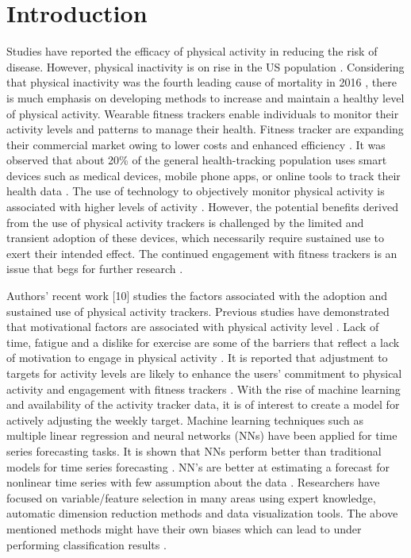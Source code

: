 \documentclass[preprint,12pt]{elsarticle}
\begin{document}
\section{Introduction}
Studies have reported the efficacy of physical activity in reducing the risk of disease. However, physical inactivity is on rise in the US population \cite{bassuk2005epidemiological}. Considering that physical inactivity was the fourth leading cause of mortality in 2016 \cite{mercer2016behavior}, there is much emphasis on developing methods to increase and maintain a healthy level of physical activity. Wearable fitness trackers enable individuals to monitor their activity levels and patterns to manage their health. Fitness tracker are expanding their commercial market owing to lower costs and enhanced efficiency \cite{eheman2012annual}. It was observed that about 20\% of the general health-tracking population uses smart devices such as medical devices, mobile phone apps, or online tools to track their health data \cite{michie2009effective}. The use of technology to objectively monitor physical activity is associated with higher levels of activity \cite{wang2016mobile}. However, the potential benefits derived from the use of physical activity trackers is challenged by the limited and transient adoption of these devices, which necessarily require sustained use to exert their intended effect. The continued engagement with fitness trackers is an issue that begs for further research \cite{wang2016mobile}.  
\par
Authors’ recent work [10] studies the factors associated with the adoption and sustained use of physical activity trackers. Previous studies have demonstrated that motivational factors are associated with physical activity level \cite{bassuk2005epidemiological}. Lack of time, fatigue and a dislike for exercise are some of the barriers that reflect a lack of motivation to engage in physical activity \cite{bassuk2005epidemiological}. It is reported that adjustment to targets for activity levels are likely to enhance the users’ commitment to physical activity and engagement with fitness trackers \cite{gouveia2015we}. With the rise of machine learning and availability of the activity tracker data, it is of interest to create a model for actively adjusting the weekly target. Machine learning techniques such as multiple linear regression and neural networks (NNs) have been applied for time series forecasting tasks. It is shown that NNs perform better than traditional models for time series forecasting \cite{hill1996neural}. NN’s are better at estimating a forecast for nonlinear time series with few assumption about the data \cite{hill1996neural}. Researchers have focused on variable/feature selection in many areas using expert knowledge, automatic dimension reduction methods and data visualization tools. The above mentioned methods might have their own biases which can lead to under performing classification results \cite{cheng2006feature}.
\end{document}
